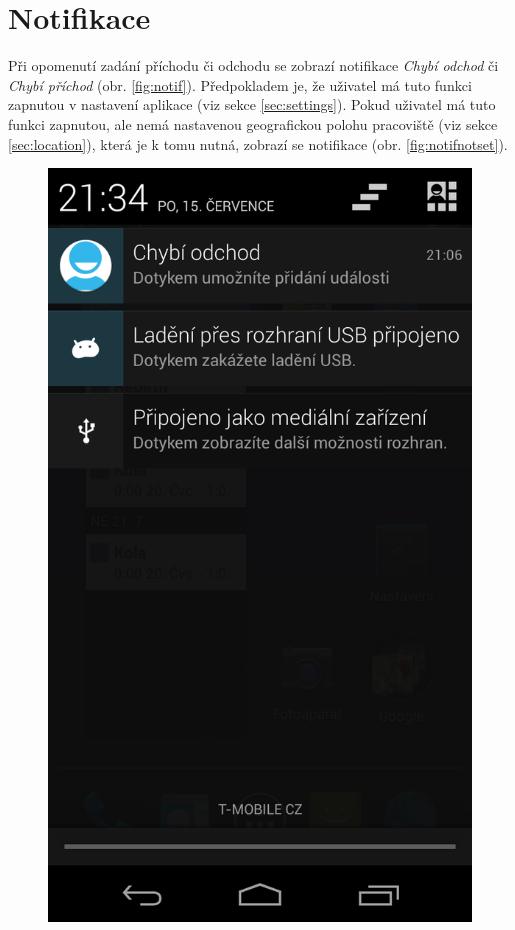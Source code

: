 \documentclass{diplomka}
\begin{document}
\section{Notifikace}
Při opomenutí zadání příchodu či odchodu se zobrazí notifikace \emph{Chybí odchod} či \emph{Chybí příchod} (obr. \ref{fig:notif}). Předpokladem je, že uživatel má tuto funkci zapnutou v nastavení aplikace (viz sekce \ref{sec:settings}). Pokud uživatel má tuto funkci zapnutou, ale nemá nastavenou geografickou polohu pracoviště (viz sekce \ref{sec:location}), která je k tomu nutná, zobrazí se notifikace  (obr. \ref{fig:notifnotset}).
\begin{figure}[H]
\centering
\begin{minipage}{.45\textwidth}
  \centering
  \includegraphics[width=.9\linewidth]{scr/notif.png}

\end{minipage}
\end{figure}
\end{document}
